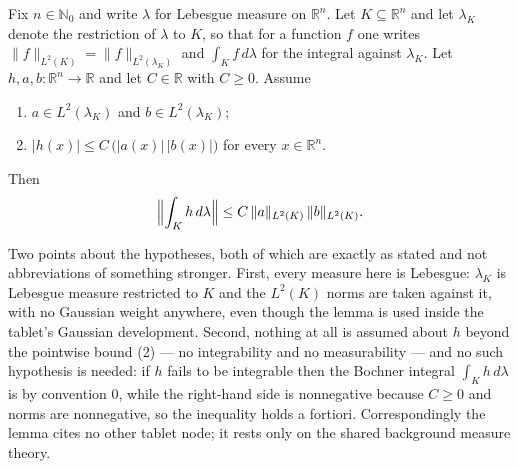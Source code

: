\begin{lemma}
Fix $n \in \mathbb{N}_0$ and write $\lambda$ for Lebesgue measure on
$\mathbb{R}^n$.  Let $K \subseteq \mathbb{R}^n$ and let
$\lambda_K$ denote the restriction of $\lambda$ to $K$, so that for a function
$f$ one writes $\|f\|_{L^2(K)} = \|f\|_{L^2(\lambda_K)}$ and
$\int_K f \, d\lambda$ for the integral against $\lambda_K$.  Let
$h, a, b : \mathbb{R}^n \to \mathbb{R}$ and let $C \in \mathbb{R}$ with
$C \geq 0$.  Assume
\begin{enumerate}
  \item $a \in L^2(\lambda_K)$ and $b \in L^2(\lambda_K)$;
  \item $|h(x)| \leq C\,\bigl(|a(x)|\,|b(x)|\bigr)$ for every
    $x \in \mathbb{R}^n$.
\end{enumerate}
Then
\[
  \Bigl\| \int_K h \, d\lambda \Bigr\|
    \leq C\,\|a\|_{L^2(K)}\,\|b\|_{L^2(K)} .
\]

Two points about the hypotheses, both of which are exactly as stated and not
abbreviations of something stronger.  First, every measure here is Lebesgue:
$\lambda_K$ is Lebesgue measure restricted to $K$ and the $L^2(K)$ norms are
taken against it, with no Gaussian weight anywhere, even though the lemma is
used inside the tablet's Gaussian development.  Second, nothing at all is
assumed about $h$ beyond the pointwise bound (2) --- no integrability and no
measurability --- and no such hypothesis is needed: if $h$ fails to be
integrable then the Bochner integral $\int_K h \, d\lambda$ is by convention
$0$, while the right-hand side is nonnegative because $C \geq 0$ and norms are
nonnegative, so the inequality holds a fortiori.  Correspondingly the lemma
cites no other tablet node; it rests only on the shared background measure
theory.
\end{lemma}
